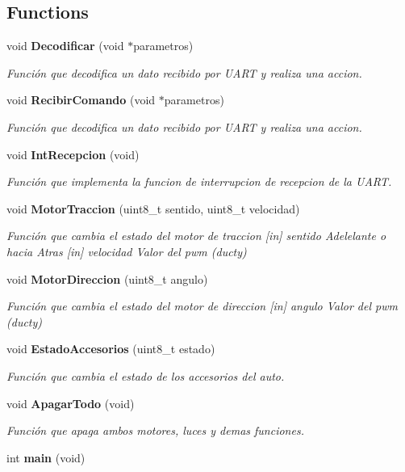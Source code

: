 \subsection*{Functions}
\begin{DoxyCompactItemize}
\item 
void \textbf{ Decodificar} (void $\ast$parametros)
\begin{DoxyCompactList}\small\item\em Función que decodifica un dato recibido por U\+A\+RT y realiza una accion. \end{DoxyCompactList}\item 
void \textbf{ Recibir\+Comando} (void $\ast$parametros)
\begin{DoxyCompactList}\small\item\em Función que decodifica un dato recibido por U\+A\+RT y realiza una accion. \end{DoxyCompactList}\item 
void \textbf{ Int\+Recepcion} (void)
\begin{DoxyCompactList}\small\item\em Función que implementa la funcion de interrupcion de recepcion de la U\+A\+RT. \end{DoxyCompactList}\item 
void \textbf{ Motor\+Traccion} (uint8\+\_\+t sentido, uint8\+\_\+t velocidad)
\begin{DoxyCompactList}\small\item\em Función que cambia el estado del motor de traccion [in] sentido Adelelante o hacia Atras [in] velocidad Valor del pwm (ducty) \end{DoxyCompactList}\item 
void \textbf{ Motor\+Direccion} (uint8\+\_\+t angulo)
\begin{DoxyCompactList}\small\item\em Función que cambia el estado del motor de direccion [in] angulo Valor del pwm (ducty) \end{DoxyCompactList}\item 
void \textbf{ Estado\+Accesorios} (uint8\+\_\+t estado)
\begin{DoxyCompactList}\small\item\em Función que cambia el estado de los accesorios del auto. \end{DoxyCompactList}\item 
void \textbf{ Apagar\+Todo} (void)
\begin{DoxyCompactList}\small\item\em Función que apaga ambos motores, luces y demas funciones. \end{DoxyCompactList}\item 
int \textbf{ main} (void)
\end{DoxyCompactItemize}
